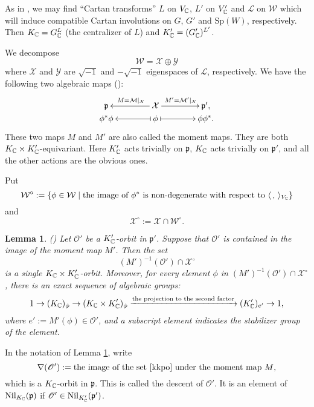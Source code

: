\documentclass[lang = american]{ems-icm} %
\newcommand{\la}{\langle}
\newcommand{\ra}{\rangle}
\def\Sp{{\mathrm{Sp}}}
\newcommand{\p}{\mathfrak p}
\newcommand{\CL}{{\mathcal {L}}}
\newcommand{\CM}{{\mathcal {M}}}
\newcommand{\CW}{{\mathcal {W}}}
\newcommand{\CX}{{\mathcal {X}}}
\newcommand{\CY}{{\mathcal {Y}}}
\newcommand{\sO}{\mathscr{O}}
\numberwithin{equation}{section}
\newtheorem{lem}[thm]{Lemma}
\theoremstyle{remark}
\begin{document}
  As in \cite[Section 3]{BMSZ3}, we may find ``Cartan transforms'' $L$ on $V_{\mathbb{C}}$, $L'$ on $V'_{\mathbb{C}}$ and $\CL$ on $\CW$ which will induce compatible Cartan involutions on $G$, $G'$ and $\Sp(W)$, respectively. Then $K_{\mathbb{C}} =G_{\mathbb{C}}^{L}$ (the centralizer of $L$) and $K'_{\mathbb{C}} =(G'_{\mathbb{C}})^{L'}$.


We decompose
\begin{equation}\label{CX}
\CW= \CX\oplus \CY
\end{equation}
where $\CX$ and $\CY$ are $\sqrt{-1}$ and $-\sqrt{-1}$ eigenspaces of $\CL$, respectively.
We have the following two algebraic maps (\cite{NOZ}):
  \[\label{momentmap}
    \xymatrix@R=0em@C=4em{
      \p &\ar[l]_{M=\CM |_{\CX}} \CX\ar[r]^{M'=\CM' |_{\CX}}& \p',\\
     \phi^* \phi & \ar@{|->}[l] \phi \ar@{|->}[r] & \phi \phi^*.
    }
  \]
These two maps $M$ and $M'$ are also called the moment maps. They are both $K_{\mathbb{C}}\times K'_{\mathbb{C}}$-equivariant. Here $K'_{\mathbb{C}}$ acts trivially on $\p$,
 $K_{\mathbb{C}}$ acts trivially on $\p'$, and all the other actions are the obvious ones.

Put
\[
  \CW^\circ:=\{\phi\in \CW \mid \textrm{the image of $\phi^*$ is non-degenerate with respect to $\la\,,\,\ra_{V_{\C}}$}\}
\]
and
\[
  \CX^\circ:=\CX\cap \CW^\circ.
\]

\begin{lem}\label{descko}\emph{(\cite{BMSZ3})}
Let $\sO'$ be a $K'_{\mathbb{C}}$-orbit in $\p'$. Suppose that $\sO'$ is contained in the image of the moment map $M'$. Then the set
\begin{equation} \label{kkpo}
  (M')^{-1}(\sO')\cap \CX^\circ
  \end{equation}
is a single $K_{\mathbb{C}}\times K'_{\mathbb{C}}$-orbit. Moreover, for every element $\phi$ in $(M')^{-1}(\sO')\cap \CX^\circ$, there is an exact sequence of algebraic groups:
\[
  1\rightarrow (K_{\mathbb{C}})_\phi \rightarrow (K_{\mathbb{C}}\times K'_{\mathbb{C}})_\phi\xrightarrow{\textrm{the projection to the second factor}} (K'_{\mathbb{C}})_{e'}\rightarrow 1,
\]
where $e':=M'(\phi)\in \sO'$, and a subscript element indicates the stabilizer group of the element.
\end{lem}

In the notation of Lemma \ref{descko}, write
\[
  \nabla(\sO'):=\textrm{the image of the set \eqref{kkpo} under the moment map  $M$,}
\]
which is a $ K_{\mathbb{C}}$-orbit in $\p$. This is called the descent of $\sO'$. It is an element of $\mathrm{Nil}_{K_{\C}}(\p)$ if $\sO'\in \mathrm{Nil}_{K'_{\C}}(\p')$.
\end{document}
